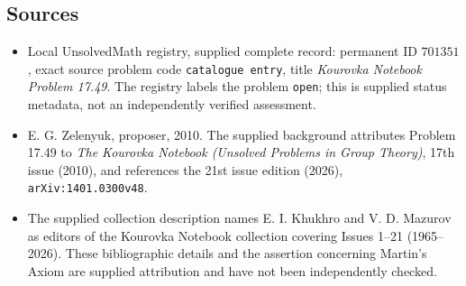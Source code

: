 \documentclass[11pt]{article}
\begin{document}
\subsection{Sources}
\begin{itemize}
\item Local UnsolvedMath registry, supplied complete record: permanent ID \(701351\), exact source problem code \texttt{catalogue entry}, title \emph{Kourovka Notebook Problem 17.49}. The registry labels the problem \texttt{open}; this is supplied status metadata, not an independently verified assessment.
\item E. G. Zelenyuk, proposer, 2010. The supplied background attributes Problem 17.49 to \emph{The Kourovka Notebook (Unsolved Problems in Group Theory)}, 17th issue (2010), and references the 21st issue edition (2026), \texttt{arXiv:1401.0300v48}.
\item The supplied collection description names E. I. Khukhro and V. D. Mazurov as editors of the Kourovka Notebook collection covering Issues 1--21 (1965--2026). These bibliographic details and the assertion concerning Martin's Axiom are supplied attribution and have not been independently checked.
\end{itemize}
\end{document}
